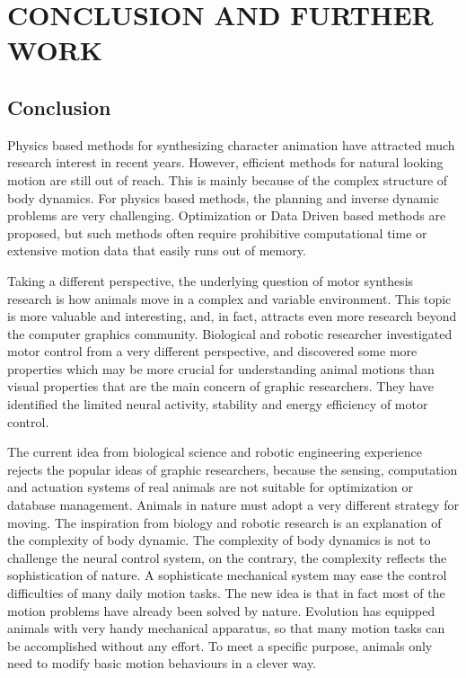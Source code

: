 \def\baselinestretch{1}
\chapter{CONCLUSION AND FURTHER WORK}
\label{chap:con}
\graphicspath{{Conclusions/ConclusionsFigs/EPS/}{Conclusions/ConclusionsFigs/}}


\def\baselinestretch{1.66}

\section{Conclusion}

Physics based methods for synthesizing character animation have attracted much research interest in recent years. 
However, efficient methods for natural looking motion are still out of reach. This is mainly because of the complex structure of body dynamics. 
For physics based methods, the planning and inverse dynamic problems are very challenging. 
Optimization or Data Driven based methods are proposed, but such methods often require prohibitive computational time or extensive motion data that easily runs out of memory.

Taking a different perspective, the underlying question of motor synthesis research is how animals move in a complex and variable environment. This topic is more valuable and interesting, and,  in fact, attracts even more research beyond the computer graphics community. 
Biological and robotic researcher investigated  motor control from a very different perspective, and discovered some more properties which may be more crucial for understanding animal motions than visual properties that are  the  main concern of graphic researchers. 
They have identified the limited neural activity, stability and energy efficiency of motor control.

The current idea from biological science and robotic engineering experience rejects the popular ideas of graphic researchers, because the sensing, computation and actuation systems of real animals are not suitable for optimization or database management. 
Animals in nature must adopt a very different strategy for moving. 
The inspiration from biology and robotic research is an explanation of the complexity of body dynamic. 
The complexity of body dynamics is not to challenge the neural control system, on the contrary, the complexity reflects the sophistication of nature. 
A sophisticate mechanical system may ease the control difficulties of many daily motion tasks. 
The new idea is that in fact most of the motion problems have already been solved by nature.
Evolution has equipped animals with very handy mechanical apparatus, so that many motion tasks can be accomplished without any effort. 
To meet a specific purpose, animals only need to modify basic motion behaviours in a clever way.

